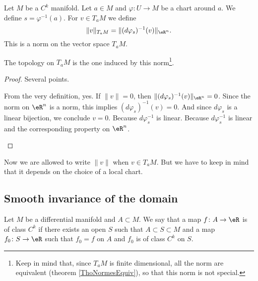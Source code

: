 \begin{propositionDef}        \label{PROPooHJOXooMGANfd}
	Let \( M\) be a \( C^k\) manifold. Let \( a\in M\) and \( \varphi\colon U\to M\) be a chart around \( a\). We define \( s=\varphi^{-1}(a)\). For \( v\in T_aM\) we define
	\begin{equation}
		\| v \|_{T_aM}=\| (d\varphi_s)^{-1}(v) \|_{\eR^n}.
	\end{equation}
	This is a norm on the vector space \( T_aM\).

	The topology on \( T_aM\) is the one induced by this norm\footnote{Keep in mind that, since \( T_aM\) is finite dimensional, all the norm are equivalent (theorem \ref{ThoNormesEquiv}), so that this norm is not special.}.
\end{propositionDef}

\begin{proof}
	Several points.
	\begin{subproof}
		\spitem[\( \| v \|\geq 0\)]
		From the very definition, yes.
		\spitem[\( \| v \|=0\) si et seulement si \( v=0\)]
		If \( \| v \|=0\), then \( \| (d\varphi_s)^{-1}(v) \|_{\eR^n}=0\). Since the norm on \( \eR^n\) is a norm, this implies \( (d\varphi_s)^{-1}(v)=0\). And since \( d\varphi_s\) is a linear bijection, we conclude \( v=0\).
		\spitem[\( \| \lambda v \|=| \lambda |\| v \|\)]
		Because \( d\varphi_s^{-1}\) is linear.
		\spitem[\( \| v+w \|\leq \| v \|+\| v \|\)]
		Because \( d\varphi_s^{-1}\) is linear and the corresponding property on \( \eR^n\).
	\end{subproof}
\end{proof}

Now we are allowed to write \( \| v \|\) when \( v\in T_aM\). But we have to keep in mind that it depends on the choice of a local chart.

\subsection{Smooth invariance of the domain}


\begin{definition}	\label{DEFooLXVNooIpoIBp}
	Let \( M\) be a differential manifold and \( A\subset M\). We say that a map \(f \colon A\to \eR  \) is of class \( C^k\) if there exists an open \( S\) such that \( A\subset S\subset M\) and a map \(f_0 \colon S\to \eR  \) such that \( f_0=f\) on \( A\) and \( f_0\) is of class \( C^k\) on \( S\).
\end{definition}

